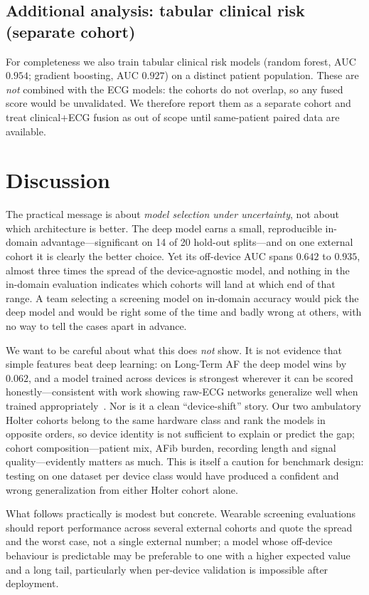\subsection{Additional analysis: tabular clinical risk (separate cohort)}
\label{sec:extra}
For completeness we also train tabular clinical risk models (random forest, AUC
$0.954$; gradient boosting, AUC $0.927$) on a distinct patient population. These
are \emph{not} combined with the ECG models: the cohorts do not overlap, so any
fused score would be unvalidated. We therefore report them as a separate cohort
and treat clinical$+$ECG fusion as out of scope until same-patient paired data are
available.

\section{Discussion}
The practical message is about \emph{model selection under uncertainty}, not about
which architecture is better. The deep model earns a small, reproducible in-domain
advantage---significant on 14 of 20 hold-out splits---and on one external cohort
it is clearly the better choice. Yet its off-device AUC spans $0.642$ to $0.935$,
almost three times the spread of the device-agnostic model, and nothing in the
in-domain evaluation indicates which cohorts will land at which end of that range.
A team selecting a screening model on in-domain accuracy would pick the deep
model and would be right some of the time and badly wrong at others, with no way
to tell the cases apart in advance.

We want to be careful about what this does \emph{not} show. It is not evidence
that simple features beat deep learning: on Long-Term AF the deep model wins by
$0.062$, and a model trained across devices is strongest wherever it can be scored
honestly---consistent with work showing raw-ECG networks generalize well when
trained appropriately~\cite{benmoshe2024rawecgnet}. Nor is it a clean
``device-shift'' story. Our two ambulatory Holter cohorts belong to the same
hardware class and rank the models in opposite orders, so device identity is not
sufficient to explain or predict the gap; cohort composition---patient mix, AFib
burden, recording length and signal quality---evidently matters as much. This is
itself a caution for benchmark design: testing on one dataset per device class
would have produced a confident and wrong generalization from either Holter cohort
alone.

What follows practically is modest but concrete. Wearable screening evaluations
should report performance across several external cohorts and quote the spread and
the worst case, not a single external number; a model whose off-device behaviour is
predictable may be preferable to one with a higher expected value and a long tail,
particularly when per-device validation is impossible after deployment.

